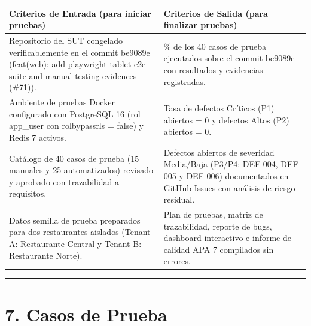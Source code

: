 \documentclass[10pt,a4paper]{article}
\newcounter{none}
\begin{document}
{\def\LTcaptype{none} %
\begin{longtable}[]{@{}
  >{\raggedright\arraybackslash}p{}
  >{\raggedright\arraybackslash}p{}@{}}
\toprule\noalign{}
\begin{minipage}[b]{\linewidth}\raggedright
Criterios de Entrada (para iniciar pruebas)
\end{minipage} & \begin{minipage}[b]{\linewidth}\raggedright
Criterios de Salida (para finalizar pruebas)
\end{minipage} \\
\midrule\noalign{}
\endhead
\bottomrule\noalign{}
\endlastfoot
Repositorio del SUT congelado verificablemente en el commit be9089e (feat(web): add playwright tablet e2e suite and manual testing evidences (\#71)). & 100\% de los 40 casos de prueba ejecutados sobre el commit be9089e con resultados y evidencias registradas. \\
Ambiente de pruebas Docker configurado con PostgreSQL 16 (rol app\_user con rolbypassrls = false) y Redis 7 activos. & Tasa de defectos Críticos (P1) abiertos = 0 y defectos Altos (P2) abiertos = 0. \\
Catálogo de 40 casos de prueba (15 manuales y 25 automatizados) revisado y aprobado con trazabilidad a requisitos. & Defectos abiertos de severidad Media/Baja (P3/P4: DEF-004, DEF-005 y DEF-006) documentados en GitHub Issues con análisis de riesgo residual. \\
Datos semilla de prueba preparados para dos restaurantes aislados (Tenant A: Restaurante Central y Tenant B: Restaurante Norte). & Plan de pruebas, matriz de trazabilidad, reporte de bugs, dashboard interactivo e informe de calidad APA 7 compilados sin errores. \\
\end{longtable}
}

\endgroup\medskip

\begin{center}\rule{0.5\linewidth}{0.5pt}\end{center}


\section{7. Casos de Prueba}\label{7-casos-de-prueba}

\end{document}
